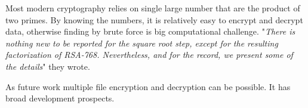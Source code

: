 \documentclass[12pt,journal,compsoc]{IEEEtran}
\begin{document}
Most modern cryptography relies on single large number that are the product of two primes. By knowing the numbers, it is relatively easy to encrypt and decrypt data, otherwise finding by brute force is big computational challenge. "\emph{There is nothing new to be reported for the square root step, except for the resulting factorization of RSA-768. Nevertheless, and for the record, we present some of the details}"\cite{768_key} they wrote.


As future work multiple file encryption and decryption can be possible. It has broad development prospects. 

{

}



%



\end{document}
